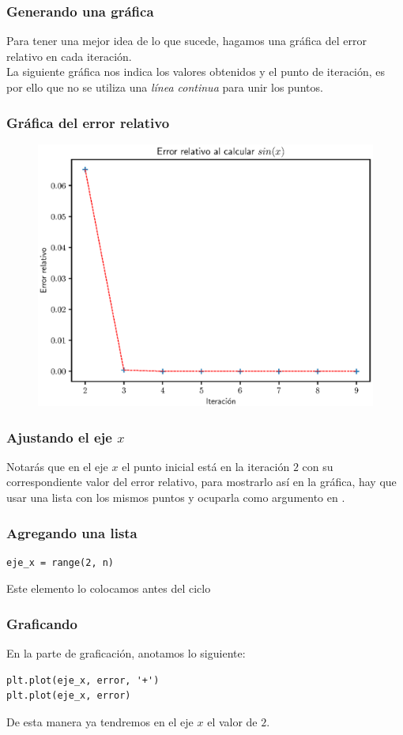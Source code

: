 \documentclass[12pt]{beamer}
\begin{document}
\begin{frame}
\frametitle{Generando una gráfica}
Para tener una mejor idea de lo que sucede, hagamos una gráfica del error relativo en cada iteración.
\\
\bigskip
\pause
La siguiente gráfica nos indica los valores obtenidos y el punto de iteración, es por ello que no se utiliza una \emph{línea continua} para unir los puntos.
\end{frame}
\begin{frame}
\frametitle{Gráfica del error relativo}
\begin{figure}
    \centering
    \includegraphics[scale=0.6]{Imagenes/Plot_Serie_Seno_01.eps}
\end{figure}
\end{frame}
\begin{frame}
\frametitle{Ajustando el eje $x$}
Notarás que en el eje $x$ el punto inicial está en la iteración $2$ con su correspondiente valor del error relativo, \pause para mostrarlo así en la gráfica, hay que usar una lista con los mismos puntos y ocuparla como argumento en .
\end{frame}
\begin{frame}[fragile]
\frametitle{Agregando una lista }
\begin{lstlisting}
eje_x = range(2, n)
\end{lstlisting}
Este elemento lo colocamos antes del ciclo 
\end{frame}
\begin{frame}[fragile]
\frametitle{Graficando}
En la parte de graficación, anotamos lo siguiente:
\begin{lstlisting}
plt.plot(eje_x, error, '+')
plt.plot(eje_x, error)
\end{lstlisting}
De esta manera ya tendremos en el eje $x$ el valor de $2$.
\end{frame}
\end{document}

